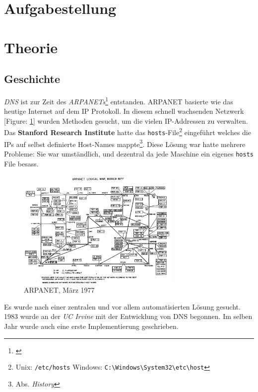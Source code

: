 \documentclass[11pt,twoside,a4paper]{article}
\title{\titleText}
\author{\authorText}
\date{\dateText}
\begin{document}
\maketitle
\tableofcontents

\section{Aufgabestellung}

\section{Theorie}

\subsection{Geschichte}

\textit{DNS} ist zur Zeit des \textit{ARPANETs}\footnote{\cite{arpanetwiki}} entstanden. ARPANET basierte wie das heutige Internet auf dem IP Protokoll. In diesem schnell wachsenden Netzwerk [Figure: \ref{arpanet77}] wurden Methoden gesucht, um die vielen IP-Addressen zu verwalten. Das \textbf{Stanford Research Institute} hatte  das \texttt{hosts}-File\footnote{Unix: \texttt{/etc/hosts} Windows: \texttt{C:\textbackslash Windows\textbackslash System32\textbackslashdrivers\textbackslash etc\textbackslash host}} eingeführt welches die IPs auf selbst definierte Host-Names mappte\footnote{\cite{dnswiki} Abs. \textit{History}}. Diese Lösung war hatte mehrere Probleme: Sie war umständlich, und dezentral da jede Maschine ein eigenes \texttt{hosts} File besass. 

\begin{figure}
  \center
  \includegraphics[width=8cm]{arpanet77}
  \caption{ARPANET, März 1977 \label{arpanet77}}
\end{figure}

Es wurde nach einer zentralen und vor allem automatisierten Lösung gesucht. 1983 wurde an der \textit{UC Irvine} mit der Entwicklung von DNS begonnen. Im selben Jahr wurde auch eine erste Implementierung geschrieben.
\end{document}
